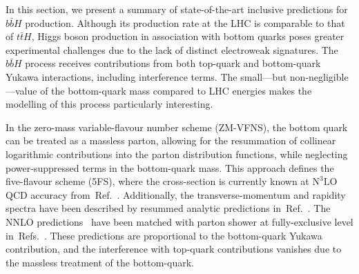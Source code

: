 \newcommand{\bbH}{$b\bar{b}H$}
\newcommand{\citere}[1]{Ref.~\cite{#1}}
\newcommand{\citeres}[1]{Refs.~\cite{#1}}
\newcommand{\tab}[1]{Table \ref{#1}}
\newcommand{\nnnlo}{$\text{N}^3\text{LO}$}
\newcommand{\noun}[1]{{\scshape #1}}
\newcommand{\minnlo}{{\noun{MiNNLO$_{\textrm{PS}}$}}}


In this section, we present a summary of state-of-the-art inclusive predictions for \bbH{} production. Although its production rate at the LHC is comparable to that of $t\bar{t}H$, Higgs boson production in association with bottom quarks poses greater experimental challenges due to the lack of distinct electroweak signatures. The \bbH{} process receives contributions from both top-quark and bottom-quark Yukawa interactions, including interference terms. The small—but non-negligible—value of the bottom-quark mass compared to LHC energies makes the modelling of this process particularly interesting.

In the zero-mass variable-flavour number scheme (ZM-VFNS), the bottom quark can be treated as a massless parton, allowing for the resummation of collinear logarithmic contributions into the parton distribution functions, while neglecting power-suppressed terms in the bottom-quark mass. This approach defines the five-flavour scheme (5FS), where the cross-section is currently known at \nnnlo{} QCD accuracy from~\citere{Duhr:2019kwi}. Additionally, the transverse-momentum and rapidity spectra have been described by resummed analytic predictions in~\citere{Cal:2023mib,Das:2024pac}. The NNLO predictions~\cite{Harlander:2003ai} have been matched with parton shower at fully-exclusive level in~\citeres{Biello:2024vdh,Gavardi:2025zpf}. These predictions are proportional to the bottom-quark Yukawa contribution, and the interference with top-quark contributions vanishes due to the massless treatment of the bottom-quark.

